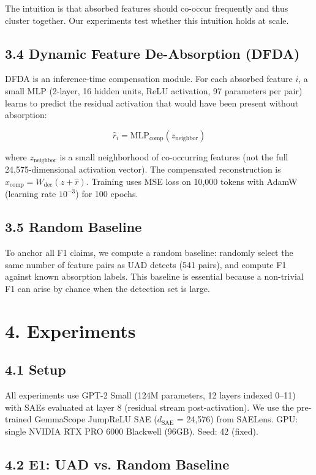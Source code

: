 \documentclass{article}
\begin{document}
The intuition is that absorbed features should co-occur frequently and thus cluster together. Our experiments test whether this intuition holds at scale.

\subsection{3.4 Dynamic Feature De-Absorption (DFDA)}

DFDA is an inference-time compensation module. For each absorbed feature $i$, a small MLP (2-layer, 16 hidden units, ReLU activation, 97 parameters per pair) learns to predict the residual activation that would have been present without absorption:

$$\hat{r}_i = \text{MLP}_{\text{comp}}(z_{\text{neighbor}})$$

where $z_{\text{neighbor}}$ is a small neighborhood of co-occurring features (not the full 24,575-dimensional activation vector). The compensated reconstruction is $\hat{x}_{\text{comp}} = W_{\text{dec}}(z + \hat{r})$. Training uses MSE loss on 10,000 tokens with AdamW (learning rate $10^{-3}$) for 100 epochs.

\subsection{3.5 Random Baseline}

To anchor all F1 claims, we compute a random baseline: randomly select the same number of feature pairs as UAD detects (541 pairs), and compute F1 against known absorption labels. This baseline is essential because a non-trivial F1 can arise by chance when the detection set is large.


\section{4. Experiments}

\subsection{4.1 Setup}

All experiments use GPT-2 Small (124M parameters, 12 layers indexed 0--11) with SAEs evaluated at layer 8 (residual stream post-activation). We use the pre-trained GemmaScope JumpReLU SAE ($d_{\text{SAE}}$ = 24,576) from SAELens. GPU: single NVIDIA RTX PRO 6000 Blackwell (96GB). Seed: 42 (fixed).

\subsection{4.2 E1: UAD vs. Random Baseline}
\end{document}

